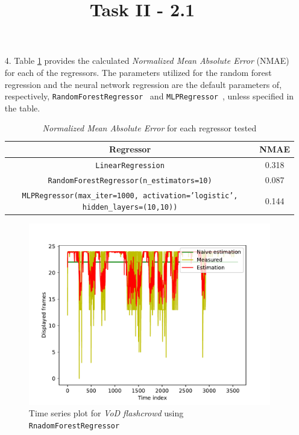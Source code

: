 \documentclass[]{article}
\begin{document}
\pagebreak

\title{\textbf{Task II - 2.1}}

\begin{enumerate}
    \item [4.]
        Table \ref{table:2} provides the calculated \textit{Normalized Mean Absolute Error} (\textsc{NMAE}) for each of the regressors. 
        The parameters utilized for the random forest regression and the neural network regression are the default parameters of, respectively, \texttt{RandomForestRegressor}~\cite{RFR} and \texttt{MLPRegressor}~\cite{MLPR}, unless specified in the table.
        \begin{table}[h!]
            \centering
            \begin{tabular}{ | c | c | }
                \hline
                Regressor & \textsc{NMAE} \\ 
                \hline
                \texttt{LinearRegression} & \num{0.318} \\ 
                \hline
                \texttt{RandomForestRegressor(n\_estimators=10)} & \num{0.087}\\ 
                \hline
                \texttt{MLPRegressor(max\_iter=1000, activation='logistic', hidden\_layers=(10,10))} & \num{0.144}\\ 
                \hline
            \end{tabular}
            \caption{\textit{Normalized Mean Absolute Error} for each regressor tested}
            \label{table:2}
        \end{table}

        \begin{figure}[h!]
        \centering
        \includegraphics[width=\textwidth,height=\textheight,keepaspectratio]{../result/project1/rfr.pdf}
        \caption{Time series plot for \textit{VoD flashcrowd} using \texttt{RnadomForestRegressor}}
        \end{figure}


\end{enumerate}
\end{document}
